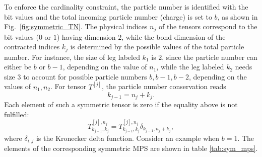 To enforce the cardinality constraint, the particle number is identified with the bit values and the total incoming particle number (charge) is set to $b$, as shown in Fig.~\ref{fig:symmetric_TN}. The physical indices $n_j$ of the tensors correspond to the bit values ($0$ or $1$) having dimension $2$, while the bond dimension of the contracted indices $k_j$ is determined by the possible values of the total particle number. For instance, the size of leg labeled $k_1$ is $2$, since the particle number can either be $b$ or $b-1$, depending on the value of $n_1$, while the leg labeled $k_2$ needs size $3$ to account for possible particle numbers $b, b-1, b-2$, depending on the values of $n_1, n_2$.
For tensor $T^{[j]}$, the particle number conservation reads
\begin{equation}\label{eq:charge_conservation}
    k_{j-1} = n_{j} + k_{j}.
\end{equation}
Each element of such a symmetric tensor is zero if the equality above is not fulfilled:
\begin{equation}\label{eq:symmetric_elements}
    T^{[j], n_j}_{k_{j-1},k_j}=T^{[j], n_j}_{k_{j-1},k_j}\delta_{k_{j-1},n_{j} + k_{j}},
\end{equation}
where $\delta_{i,j}$ is the Kronecker delta function. 
Consider an example when $b=1$. The elements of the corresponding symmetric MPS are shown in table \ref{tab:sym_mps}.
